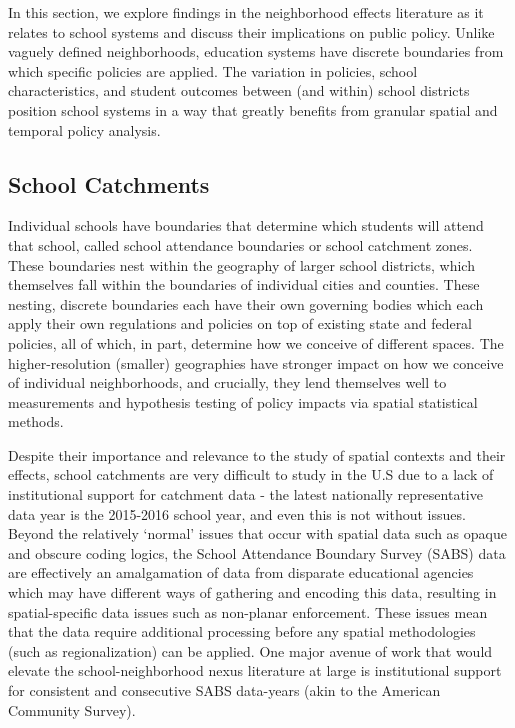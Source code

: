 In this section, we explore findings in the neighborhood effects
literature as it relates to school systems and discuss their
implications on public policy. Unlike vaguely defined neighborhoods,
education systems have discrete boundaries from which specific
policies are applied. The variation in policies, school
characteristics, and student outcomes between (and within) school
districts position school systems in a way that greatly benefits from
granular spatial and temporal policy analysis.

\subsection{School Catchments}

Individual schools have boundaries that determine which students will
attend that school, called school attendance boundaries or school
catchment zones. These boundaries nest within the geography of larger
school districts, which themselves fall within the boundaries of
individual cities and counties. These nesting, discrete boundaries
each have their own governing bodies which each apply their own
regulations and policies on top of existing state and federal
policies, all of which, in part, determine how we conceive of
different spaces. The higher-resolution (smaller) geographies have
stronger impact on how we conceive of individual neighborhoods, and
crucially, they lend themselves well to measurements and hypothesis
testing of policy impacts via spatial statistical methods.

Despite their importance and relevance to the study of spatial
contexts and their effects, school catchments are very difficult to
study in the U.S due to a lack of institutional support for catchment
data - the latest nationally representative data year is the 2015-2016
school year, and even this is not without issues. Beyond the
relatively `normal' issues that occur with spatial data such as opaque
and obscure coding logics, the School Attendance Boundary Survey
(SABS) data are effectively an amalgamation of data from disparate
educational agencies which may have different ways of gathering and
encoding this data, resulting in spatial-specific data issues such as
non-planar enforcement. These issues mean that the data require
additional processing before any spatial methodologies (such as
regionalization) can be applied. One major avenue of work that would
elevate the school-neighborhood nexus literature at large is
institutional support for consistent and consecutive SABS data-years
(akin to the American Community Survey).



